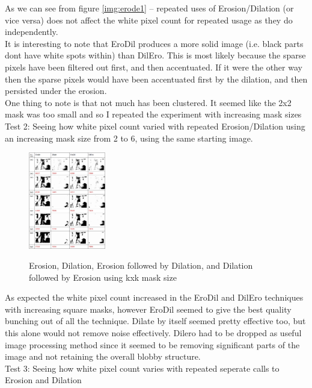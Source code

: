 \documentclass[11pt]{article} %
\begin{document}
As we can see from figure \cref{img:erode1} -- repeated uses of Erosion/Dilation (or vice versa) does not affect the white pixel count for repeated usage as they do independently.
\\It is interesting to note that EroDil produces a more solid image (i.e. black parts dont have white spots within) than DilEro. This is most likely because the sparse pixels have been filtered out first, and then accentuated. If it were the other way then the sparse pixels would have been accentuated first by the dilation, and then persisted under the erosion.
\\One thing to note is that not much has been clustered. It seemed like the 2x2 mask was too small and so I repeated the experiment with increasing mask sizes
\\ Test 2: Seeing how white pixel count varied with repeated Erosion/Dilation using an increasing mask size from 2 to 6, using the same starting image.
\begin{figure}
	\vspace{-20pt}
	\begin{center}
		\includegraphics[width=0.3\textwidth]{../images/ImageOps/test2}
		\label{img:erode2}
	\end{center}
	\vspace{-20pt}
	\caption{Erosion, Dilation, Erosion followed by Dilation, and Dilation followed by Erosion using kxk mask size}
\end{figure}
As expected the white pixel count increased in the EroDil and DilEro techniques with increasing square masks, however EroDil seemed to give the best quality bunching out of all the technique. Dilate by itself seemed pretty effective too, but this alone would not remove noise effectively. Dilero had to be dropped as useful image processing method since it seemed to be removing significant parts of the image and not retaining the overall blobby structure.
\\Test 3: Seeing how white pixel count varies with repeated seperate calls to Erosion and Dilation
\end{document}
